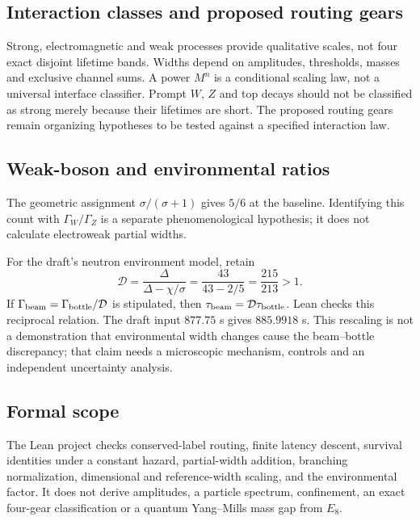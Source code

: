 \subsection{Interaction classes and proposed routing gears}
Strong, electromagnetic and weak processes provide qualitative scales, not four exact disjoint lifetime bands. Widths depend on amplitudes, thresholds, masses and exclusive channel sums. A power $M^n$ is a conditional scaling law, not a universal interface classifier. Prompt $W$, $Z$ and top decays should not be classified as strong merely because their lifetimes are short. The proposed routing gears remain organizing hypotheses to be tested against a specified interaction law.

\subsection{Weak-boson and environmental ratios}
The geometric assignment $\sigma/(\sigma+1)$ gives $5/6$ at the baseline. Identifying this count with $\Gamma_W/\Gamma_Z$ is a separate phenomenological hypothesis; it does not calculate electroweak partial widths.

For the draft's neutron environment model, retain
\begin{equation}
\mathcal D=\frac{\Delta}{\Delta-\chi/\sigma}
=\frac{43}{43-2/5}=\frac{215}{213}>1.
\end{equation}
If $\Gamma_{\rm beam}=\Gamma_{\rm bottle}/\mathcal D$ is stipulated, then $\tau_{\rm beam}=\mathcal D\tau_{\rm bottle}$. Lean checks this reciprocal relation. The draft input $877.75$ s gives $885.9918$ s. This rescaling is not a demonstration that environmental width changes cause the beam--bottle discrepancy; that claim needs a microscopic mechanism, controls and an independent uncertainty analysis.

\subsection{Formal scope}
The Lean project checks conserved-label routing, finite latency descent, survival identities under a constant hazard, partial-width addition, branching normalization, dimensional and reference-width scaling, and the environmental factor. It does not derive amplitudes, a particle spectrum, confinement, an exact four-gear classification or a quantum Yang--Mills mass gap from $E_8$.
